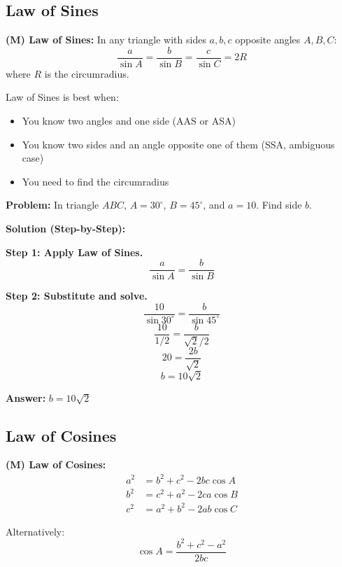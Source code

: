 \documentclass[12pt]{extarticle}
\begin{document}
\subsection{Law of Sines}

\begin{theorembox}
\textbf{(M) Law of Sines:}
In any triangle with sides $a, b, c$ opposite angles $A, B, C$:
\[
\frac{a}{\sin A} = \frac{b}{\sin B} = \frac{c}{\sin C} = 2R
\]
where $R$ is the circumradius.
\end{theorembox}

\begin{conceptbox}
Law of Sines is best when:
\begin{itemize}
\item You know two angles and one side (AAS or ASA)
\item You know two sides and an angle opposite one of them (SSA, ambiguous case)
\item You need to find the circumradius
\end{itemize}
\end{conceptbox}

\begin{examplebox}
\textbf{Problem:} In triangle $ABC$, $A = 30^\circ$, $B = 45^\circ$, and $a = 10$. Find side $b$.

\textbf{Solution (Step-by-Step):}

\textbf{Step 1: Apply Law of Sines.}
\[
\frac{a}{\sin A} = \frac{b}{\sin B}
\]

\textbf{Step 2: Substitute and solve.}
\[
\frac{10}{\sin 30^\circ} = \frac{b}{\sin 45^\circ}
\]
\[
\frac{10}{1/2} = \frac{b}{\sqrt{2}/2}
\]
\[
20 = \frac{2b}{\sqrt{2}}
\]
\[
b = 10\sqrt{2}
\]

\textbf{Answer:} $\boxed{b = 10\sqrt{2}}$
\end{examplebox}

\subsection{Law of Cosines}

\begin{theorembox}
\textbf{(M) Law of Cosines:}
\begin{align}
a^2 &= b^2 + c^2 - 2bc\cos A \\
b^2 &= c^2 + a^2 - 2ca\cos B \\
c^2 &= a^2 + b^2 - 2ab\cos C
\end{align}

Alternatively:
\[
\cos A = \frac{b^2 + c^2 - a^2}{2bc}
\]
\end{theorembox}
\end{document}
